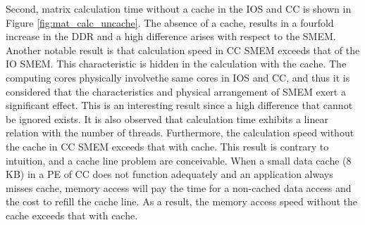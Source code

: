 \documentclass[conference,compsoc]{IEEEtran}
\begin{document}
Second, matrix calculation time without a cache in the IOS and CC is shown in Figure \ref{fig:mat_calc_uncache}.
The absence of a cache, results in a fourfold increase in the DDR and a high difference arises with respect to the SMEM.
Another notable result is that calculation speed in CC SMEM exceeds that of the IO SMEM.
This characteristic is hidden in the calculation with the cache.
The computing cores physically involvethe same cores in IOS and CC, and thus it is considered that the characteristics and physical arrangement of SMEM exert a significant effect.
This is an interesting result since a high difference that cannot be ignored exists.
It is also observed that calculation time exhibits a linear relation with the number of threads.
Furthermore, the calculation speed without the cache in CC SMEM exceeds that with cache.
This result is contrary to intuition, and a cache line problem are conceivable.
When a small data cache (8 KB) in a PE of CC does not function adequately and an application always misses cache, memory access will pay the time for a non-cached data access and the cost to refill the cache line.
As a result, the memory access speed without the cache exceeds that with cache.
\end{document}
